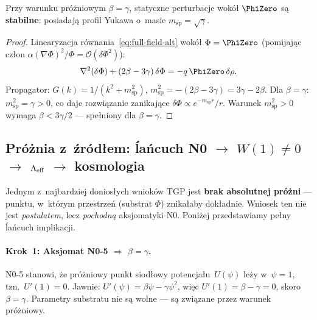 \begin{proposition}\label{prop:vacuum-stability}
Przy warunku pr\'o\.zniowym $\beta = \gamma$, statyczne perturbacje
wok\'o\l{} $\PhiZero$ s\k{a} \textbf{stabilne}: posiadaj\k{a} profil
Yukawa o~masie $m_{\mathrm{sp}} = \sqrt{\gamma}$.
\end{proposition}

\begin{proof}
Linearyzacja r\'ownania~\eqref{eq:full-field-alt}
wok\'o\l{} $\Phi = \PhiZero$ (pomijaj\k{a}c cz\l{}on
$\alpha(\nabla\Phi)^2/\Phi = \mathcal{O}(\delta\Phi^2)$):
\begin{equation}
  \nabla^2(\delta\Phi) + (2\beta - 3\gamma)\,\delta\Phi = -q\,\PhiZero\,\delta\rho.
\end{equation}
Propagator: $G(k) = 1/(k^2 + m_{\mathrm{sp}}^2)$,
$m_{\mathrm{sp}}^2 = -(2\beta - 3\gamma) = 3\gamma - 2\beta$.
Dla $\beta = \gamma$: $m_{\mathrm{sp}}^2 = \gamma > 0$,
co daje rozwi\k{a}zanie zanikaj\k{a}ce $\delta\Phi \propto e^{-m_{\mathrm{sp}} r}/r$.
Warunek $m_{\mathrm{sp}}^2 > 0$ wymaga $\beta < 3\gamma/2$ ---
spe\l{}niony dla $\beta = \gamma$.
\end{proof}


\subsection{Pr\'o\.znia z~\'zr\'od\l{}em: \'la\'ncuch N0 $\to$ $W(1)\neq 0$
  $\to$ $\Lambda_{\rm eff}$ $\to$ kosmologia}\label{ssec:vacuum-source-chain}

\noindent
Jednym z~najbardziej donios\l{}ych wniok\'ow TGP jest \textbf{brak absolutnej
pr\'o\.zni} --- punktu, w~kt\'orym przestrze\'n (substrat $\Phi$) znika\l{}aby
dok\l{}adnie.
Wniosek ten nie jest \emph{postulatem}, lecz \emph{pochodn\k{a}} aksjomatyki N0.
Poni\.zej przedstawiamy pe\l{}ny \'la\'ncuch implikacji.

\paragraph{Krok~1: Aksjomat N0-5 $\Rightarrow$ $\beta = \gamma$.}
N0-5 stanowi, \.ze pr\'o\.zniowy punkt siod\l{}owy potencja\l{}u~$U(\psi)$
le\.zy w~$\psi = 1$, tzn.\ $U'(1) = 0$.
Jawnie: $U'(\psi) = \beta\psi - \gamma\psi^2$, wi\k{e}c $U'(1) = \beta - \gamma = 0$,
skoro $\beta = \gamma$. Parametry substratu nie s\k{a} wolne --- s\k{a}
zwi\k{a}zane przez warunek pr\'o\.zniowy.

